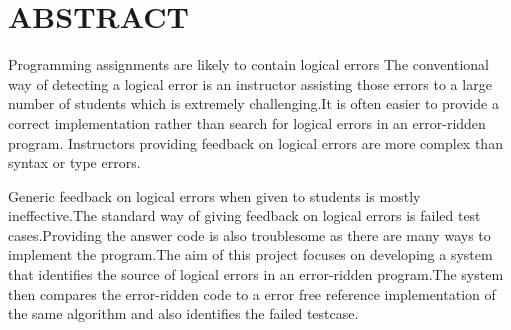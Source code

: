 \chapter*{\uppercase{ABSTRACT}}
Programming assignments are likely to contain logical errors
The conventional way of detecting a logical error is an instructor assisting those errors to a large number of students which is extremely challenging.It is often easier to provide a correct implementation rather than search for logical errors in an error-ridden program.
Instructors providing feedback on  logical errors are more complex than syntax or type errors.
\par  Generic feedback on logical errors when given to students is mostly ineffective.The standard way of giving feedback on logical errors is failed test cases.Providing the answer code is also troublesome as there are many ways to implement the program.The aim of this project focuses on developing a system that identifies the source of logical errors in an error-ridden program.The system then compares the error-ridden code to a error free reference implementation of the same algorithm and also identifies the failed testcase.